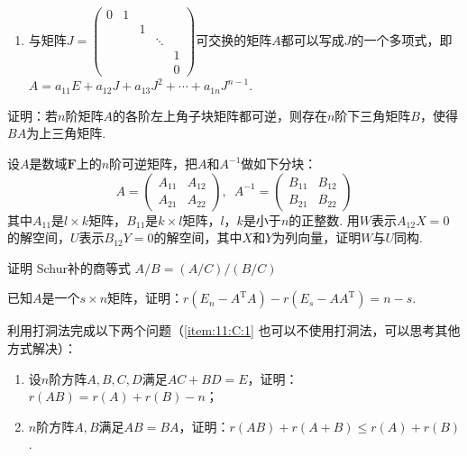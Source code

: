 \begin{exercise}
\begin{exgroup}
\begin{enumerate}
            \item 与矩阵$J=\begin{pmatrix}
                          0 & 1 &   &        &   \\
                            &   & 1 &        &   \\
                            &   &   & \ddots &   \\
                            &   &   &        & 1 \\
                            &   &   &        & 0
                      \end{pmatrix}$可交换的矩阵$A$都可以写成$J$的一个多项式，即$A=a_{11}E+a_{12}J+a_{13}J^2+\cdots+a_{1n}J^{n-1}$.
        \end{enumerate}

        \item 证明：若$n$阶矩阵$A$的各阶左上角子块矩阵都可逆，则存在$n$阶下三角矩阵$B$，使得$BA$为上三角矩阵.

        \item 设$A$是数域$\mathbf{F}$上的$n$阶可逆矩阵，把$A$和$A^{-1}$做如下分块：
        \[A=\begin{pmatrix}
                A_{11} & A_{12} \\ A_{21} & A_{22}
            \end{pmatrix},\enspace A^{-1}=\begin{pmatrix}
                B_{11} & B_{12} \\ B_{21} & B_{22}
            \end{pmatrix}\]
        其中$A_{11}$是$l \times k$矩阵，$B_{11}$是$k \times l$矩阵，$l$，$k$是小于$n$的正整数. 用$W$表示$A_{12}X=0$的解空间，$U$表示$B_{12}Y=0$的解空间，其中$X$和$Y$为列向量，证明$W$与$U$同构.

        \item 证明 Schur补的商等式 $A/B=(A/C)/(B/C)$%

        \item 已知$A$是一个$s \times n$矩阵，证明：$r(E_n-A^\mathrm{T}A)-r(E_s-AA^\mathrm{T})=n-s$.

        \item 利用打洞法完成以下两个问题（\ref*{item:11:C:1} 也可以不使用打洞法，可以思考其他方式解决）：
        \begin{enumerate}
            \item 设$n$阶方阵$A,B,C,D$满足$AC+BD=E$，证明：$r(AB) = r(A)+r(B)-n$；

            \item \label{item:11:C:1}
                  $n$阶方阵$A,B$满足$AB=BA$，证明：$r(AB)+r(A+B)\leqslant r(A)+r(B)$.
        \end{enumerate}


\end{exgroup}
\end{exercise}
